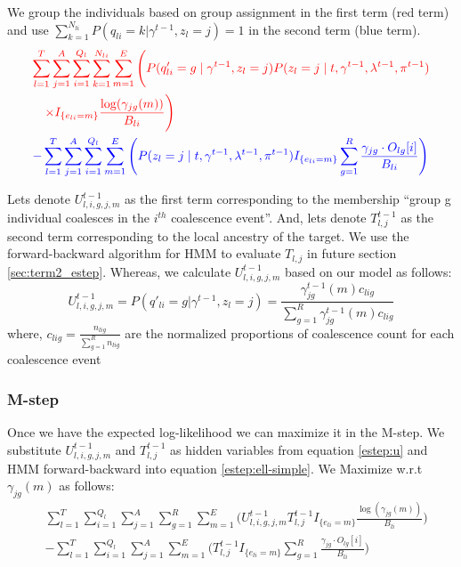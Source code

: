 We group the individuals based on group assignment in the first term (red term) and use $\sum_{k =1}^{N_{li}} P(q_{li} = k | \gamma^{t-1}, z_l = j) = 1$ in the second term (blue term). 
\begin{align}
   &\color{red}{\sum_{l = 1}^T \sum_{j = 1}^A \sum_{i = 1}^{Q_l} \sum_{k = 1}^{N_{li}} \sum_{m = 1}^E \Bigg( 
       P(q'_{li} = g \mid \gamma^{t-1}, z_l = j) P(z_l = j \mid t, \gamma^{t-1}, \lambda^{t-1}, \pi^{t-1})} \nonumber \\
   &\quad \color{red}{\times I_{\{e_{l i} = m\}} \frac{\log(\gamma_{jg}(m))}{B_{li}} \Bigg)} \nonumber \\
   &\color{blue}{- \sum_{l = 1}^T \sum_{j = 1}^A \sum_{i = 1}^{Q_l} \sum_{m = 1}^E \Bigg( 
       P(z_l = j \mid t, \gamma^{t-1}, \lambda^{t-1}, \pi^{t-1}) I_{\{e_{l i} = m\}}}  \sum_{g=1}^R \frac{\gamma_{jg} \cdot O_{lg}[i]}{B_{li}} \Bigg)
   \label{estep:ell-simple}
\end{align}

Lets denote $U_{l,i,g,j,m}^{t-1}$ as the first term corresponding to the membership ``group g individual coalesces in the $i^{th}$ coalescence event''. And, lets denote $T_{l,j}^{t-1}$ as the second term corresponding to the local ancestry of the target. We use the forward-backward algorithm for HMM to evaluate $T_{l,j}$ in future section \ref{sec:term2_estep}. Whereas, we calculate $U_{l,i,g,j,m}^{t-1}$ based on our model as follows:
\begin{equation}
    U_{l,i,g,j,m}^{t-1} = P(q'_{li} = g | \gamma^{t-1}, z_l = j) = \frac{\gamma_{jg}^{t-1}(m)c_{lig}}{\sum_{g=1}^R \gamma_{jg}^{t-1}(m)c_{lig}}
    \label{estep:u}
\end{equation}
where, $c_{lig} = \frac{n_{lig}}{\sum_{g=1}^R n_{lig}}$ are the normalized proportions of coalescence count for each coalescence event

\subsubsection{M-step}

Once we have the expected log-likelihood we can maximize it in the M-step. We substitute $U_{l,i,g,j,m}^{t-1}$ and $T_{l,j}^{t-1}$ as hidden variables from equation \ref{estep:u} and HMM forward-backward into equation \ref{estep:ell-simple}. We Maximize w.r.t $\gamma_{jg}(m)$ as follows:
\begin{align}
    &\sum_{l = 1}^T \sum_{i = 1}^{Q_l} \sum_{j = 1}^A \sum_{g = 1}^R \sum_{m = 1}^E \Bigg( 
        U_{l,i,g,j,m}^{t-1} T_{l,j}^{t-1} I_{\{e_{l i} = m\}} \frac{\log(\gamma_{jg}(m))}{B_{li}} \Bigg) \nonumber \\
    &- \sum_{l = 1}^T \sum_{i = 1}^{Q_l} \sum_{j = 1}^A \sum_{m = 1}^E \Bigg( 
        T_{l,j}^{t-1} I_{\{e_{l i} = m\}} \sum_{g = 1}^R \frac{\gamma_{jg} \cdot O_{lg}[i]}{B_{li}} \Bigg)
\end{align}

